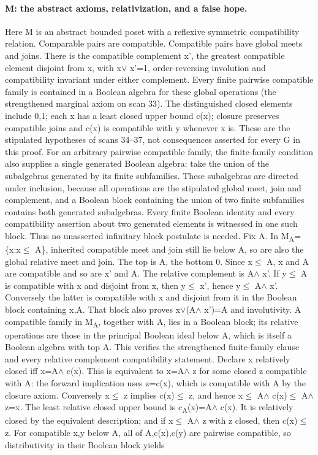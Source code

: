 \paragraph{M: the abstract axioms, relativization, and a false hope.}\label{lem:abstract}
Here M is an abstract bounded poset with a reflexive symmetric compatibility relation. Comparable pairs are compatible. Compatible pairs have global meets and joins. There is the compatible complement x', the greatest compatible element disjoint from x, with x$\vee$ x'=1, order-reversing involution and compatibility invariant under either complement. Every finite pairwise compatible family is contained in a Boolean algebra for these global operations (the strengthened marginal axiom on scan 33). The distinguished closed elements include 0,1; each x has a least closed upper bound c(x); closure preserves compatible joins and c(x) is compatible with y whenever x is. These are the stipulated hypotheses of scans 34--37, not consequences asserted for every G in this proof. For an arbitrary pairwise compatible family, the finite-family condition also supplies a single generated Boolean algebra: take the union of the subalgebras generated by its finite subfamilies. These subalgebras are directed under inclusion, because all operations are the stipulated global meet, join and complement, and a Boolean block containing the union of two finite subfamilies contains both generated subalgebras. Every finite Boolean identity and every compatibility assertion about two generated elements is witnessed in one such block. Thus no unasserted infinitary block postulate is needed.
Fix A. In M\textsubscript{A}=\{x:x$\leq$ A\}, inherited compatible meet and join still lie below A, so are also the global relative meet and join. The top is A, the bottom 0. Since x$\leq$ A, x and A are compatible and so are x' and A. The relative complement is A$\wedge$ x'. If y$\leq$ A is compatible with x and disjoint from x, then y$\leq$ x', hence y$\leq$ A$\wedge$ x'. Conversely the latter is compatible with x and disjoint from it in the Boolean block containing x,A. That block also proves x$\vee$(A$\wedge$ x')=A and involutivity. A compatible family in M\textsubscript{A}, together with A, lies in a Boolean block; its relative operations are those in the principal Boolean ideal below A, which is itself a Boolean algebra with top A. This verifies the strengthened finite-family clause and every relative complement compatibility statement.
Declare x relatively closed iff x=A$\wedge$ c(x). This is equivalent to x=A$\wedge$ z for some closed z compatible with A: the forward implication uses z=c(x), which is compatible with A by the closure axiom. Conversely x$\leq$ z implies c(x)$\leq$ z, and hence x$\leq$ A$\wedge$ c(x)$\leq$ A$\wedge$ z=x. The least relative closed upper bound is c\textsubscript{A}(x)=A$\wedge$ c(x). It is relatively closed by the equivalent description; and if x$\leq$ A$\wedge$ z with z closed, then c(x)$\leq$ z. For compatible x,y below A, all of A,c(x),c(y) are pairwise compatible, so distributivity in their Boolean block yields
